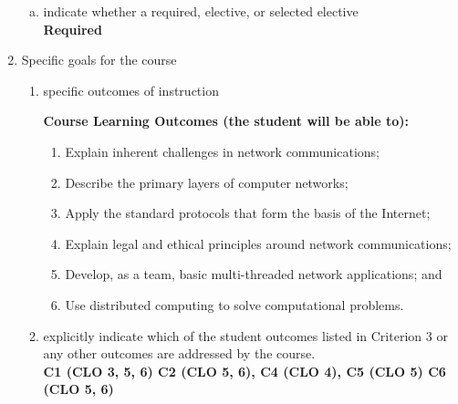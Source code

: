 \begin{enumerate}[1.]
\begin{enumerate}[a.]
\item indicate whether a required, elective, or selected elective\\ %
  {\bfseries
    Required
  }

\end{enumerate}

\item Specific goals for the course
\begin{enumerate}
\item specific outcomes of instruction\\ %
  {\bfseries
    Course Learning Outcomes (the student will be able to):
\begin{enumerate}
\item Explain inherent challenges in network communications;
\item Describe the primary layers of computer networks;
\item Apply the standard protocols that form the basis of the Internet;
\item Explain legal and ethical principles around network communications;
\item Develop, as a team, basic multi-threaded network applications; and
\item Use distributed computing to solve computational problems.
\end{enumerate}
  }

\item explicitly indicate which of the student outcomes listed in Criterion 3 or any other outcomes are addressed by the course.\\
  {\bfseries
    C1 (CLO 3, 5, 6)
    C2 (CLO 5, 6),
    C4 (CLO 4),
    C5 (CLO 5)
    C6 (CLO 5, 6)
  }
\end{enumerate}


\end{enumerate}
